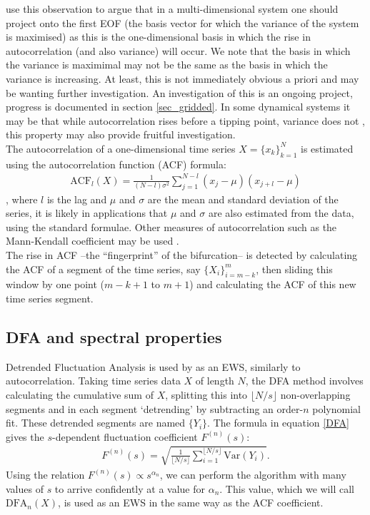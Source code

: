 \documentclass[11pt,a4paper,reqno]{article}
\numberwithin{equation}{section}
\begin{document}
\cite{held2004} use this observation to argue that in a multi-dimensional system one should project onto the first EOF (the basis vector for which the variance of the system is maximised) as this is the one-dimensional basis in which the rise in autocorrelation (and also variance) will occur. We note that the basis in which the variance is maximimal may not be the same as the basis in which the variance is increasing. At least, this is not immediately obvious a priori and may be wanting further investigation. An investigation of this is an ongoing project, progress is documented in section \ref{sec_gridded}. In some dynamical systems it may be that while autocorrelation rises before a tipping point, variance does not \citep{gsell2016}, this property may also provide fruitful investigation.\\

The autocorrelation of a one-dimensional time series $X=\{x_k\}_{k=1}^{N}$ is estimated using the autocorrelation function (ACF) formula:
\begin{align}
\label{eqn_ACF_formula}
\text{ACF}_{l}(X) = \frac{1}{(N-l)\sigma^2}\sum_{j=1}^{N-l}(x_{j}-\mu)(x_{j+l} - \mu)
\end{align} 
\citep{held2004}, where $l$ is the lag and $\mu$ and $\sigma$ are the mean and standard deviation of the series, it is likely in applications that $\mu$ and $\sigma$ are also estimated from the data, using the standard formulae. Other measures of autocorrelation such as the Mann-Kendall coefficient may be used \citep{yue2002}.\\

The rise in ACF --the ``fingerprint'' of the bifurcation-- is  detected by calculating the ACF of a segment of the time series, say $\{X_i\}_{i=m-k}^{m}$, then sliding this window by one point ($m-k+1$ to $m+1$) and calculating the ACF of this new time series segment. 


\subsection{DFA and spectral properties}

Detrended Fluctuation Analysis \citep{kantelhardt2001} is used by \cite{livina2007} as an EWS, similarly to autocorrelation. Taking time series data $X$ of length $N$, the DFA method involves calculating the cumulative sum of $X$, splitting this into $\lfloor N/s \rfloor$ non-overlapping segments and in each segment `detrending' by subtracting an order-$n$ polynomial fit. These detrended segments are named $\{Y_i\}$. The formula in equation \ref{DFA} gives the $s$-dependent fluctuation coefficient $F^{(n)}(s)$:
\begin{align}
F^{(n)}(s) = \sqrt{ \frac{1}{\lfloor N/s \rfloor} \sum_{i=1}^{\lfloor N/s \rfloor} \text{Var}(Y_i)}.
\label{DFA}
\end{align}
Using the relation $F^{(n)}(s) \propto s^{\alpha_n}$, we can perform the algorithm with many values of $s$ to arrive confidently at a value for $\alpha_n$. This value, which we will call $\text{DFA}_n(X)$, is used as an EWS in the same way as the ACF coefficient.\\
\end{document}
